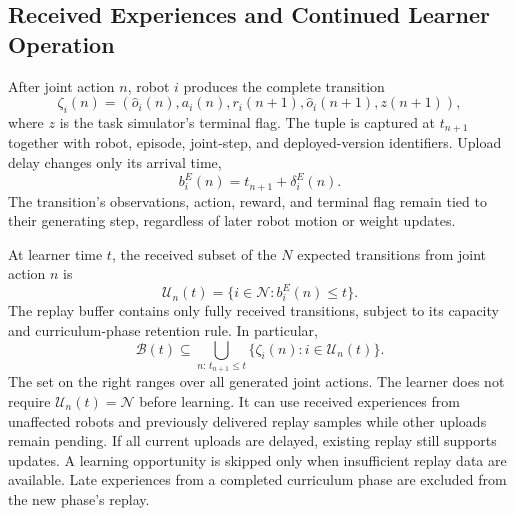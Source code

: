\begin{panamaaddition}
\subsection{Received Experiences and Continued Learner Operation}
After joint action $n$, robot $i$ produces the complete transition
\begin{equation}
 \zeta_i(n)=
 (\widehat{o}_i(n),a_i(n),r_i(n+1),
  \widehat{o}_i(n+1),z(n+1)),
 \label{eq:panama-transition}
\end{equation}
where $z$ is the task simulator's terminal flag. The tuple is captured at
$t_{n+1}$ together with robot, episode, joint-step, and deployed-version
identifiers. Upload delay changes only its arrival time,
\begin{equation}
 b_i^E(n)=t_{n+1}+\delta_i^E(n).
 \label{eq:panama-upload}
\end{equation}
The transition's observations, action, reward, and terminal flag remain tied
to their generating step, regardless of later robot motion or weight updates.

At learner time $t$, the received subset of the $N$ expected transitions
from joint action $n$ is
\begin{equation}
 \mathcal{U}_n(t)=\{i\in\mathcal{N}:b_i^E(n)\leq t\}.
 \label{eq:panama-subset}
\end{equation}
The replay buffer contains only fully received transitions, subject to its
capacity and curriculum-phase retention rule. In particular,
\begin{equation}
 \mathcal{B}(t)\subseteq
 \bigcup_{n:\,t_{n+1}\leq t}
 \{\zeta_i(n):i\in\mathcal{U}_n(t)\}.
 \label{eq:panama-replay}
\end{equation}
The set on the right ranges over all generated joint actions. The learner
does not require $\mathcal{U}_n(t)=\mathcal{N}$ before learning. It can use
received experiences from unaffected robots and previously delivered replay
samples while other uploads remain pending. If all current uploads are
delayed, existing replay still supports updates. A learning opportunity is
skipped only when insufficient replay data are available. Late experiences
from a completed curriculum phase are excluded from the new phase's replay.


\end{panamaaddition}
